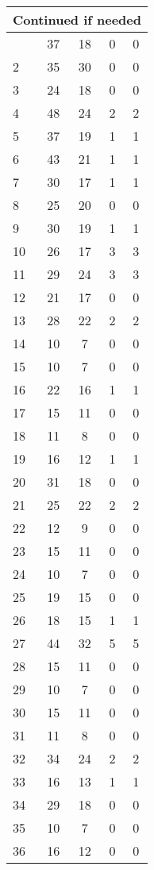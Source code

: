 \begin{center}
\begin{longtable}{l|c|c|c|c}
\hline \multicolumn{5}{|r|}{{Continued if needed}} \\ \hline
\endfoot 
1 & 37 & 18 & 0 & 0\\ \hline
2 & 35 & 30 & 0 & 0\\ \hline
3 & 24 & 18 & 0 & 0\\ \hline
4 & 48 & 24 & 2 & 2\\ \hline
5 & 37 & 19 & 1 & 1\\ \hline
6 & 43 & 21 & 1 & 1\\ \hline
7 & 30 & 17 & 1 & 1\\ \hline
8 & 25 & 20 & 0 & 0\\ \hline
9 & 30 & 19 & 1 & 1\\ \hline
10 & 26 & 17 & 3 & 3\\ \hline
11 & 29 & 24 & 3 & 3\\ \hline
12 & 21 & 17 & 0 & 0\\ \hline
13 & 28 & 22 & 2 & 2\\ \hline
14 & 10 & 7 & 0 & 0\\ \hline
15 & 10 & 7 & 0 & 0\\ \hline
16 & 22 & 16 & 1 & 1\\ \hline
17 & 15 & 11 & 0 & 0\\ \hline
18 & 11 & 8 & 0 & 0\\ \hline
19 & 16 & 12 & 1 & 1\\ \hline
20 & 31 & 18 & 0 & 0\\ \hline
21 & 25 & 22 & 2 & 2\\ \hline
22 & 12 & 9 & 0 & 0\\ \hline
23 & 15 & 11 & 0 & 0\\ \hline
24 & 10 & 7 & 0 & 0\\ \hline
25 & 19 & 15 & 0 & 0\\ \hline
26 & 18 & 15 & 1 & 1\\ \hline
27 & 44 & 32 & 5 & 5\\ \hline
28 & 15 & 11 & 0 & 0\\ \hline
29 & 10 & 7 & 0 & 0\\ \hline
30 & 15 & 11 & 0 & 0\\ \hline
31 & 11 & 8 & 0 & 0\\ \hline
32 & 34 & 24 & 2 & 2\\ \hline
33 & 16 & 13 & 1 & 1\\ \hline
34 & 29 & 18 & 0 & 0\\ \hline
35 & 10 & 7 & 0 & 0\\ \hline
36 & 16 & 12 & 0 & 0\\ \hline

\end{longtable}
\end{center}
